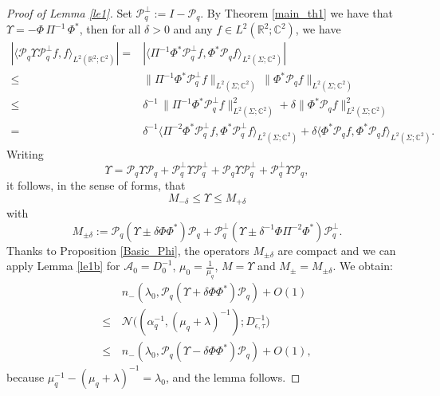 \documentclass[11pt,a4paper,reqno,oneside]{amsproc}
\def \cc {{\mathbb C}}
\numberwithin{equation}{section}
\def \cc {{\mathbb{C}}}
\begin{document}
\begin{proof}[Proof of Lemma \ref{le1}]  Set $\mathcal P_q^{\perp}:= I -\mathcal P_q$.  By Theorem \ref{main_th1} we have that  $\Upsilon= -\Phi\,\Pi^{-1}\,\Phi^{*}$, 
then for all $\delta > 0$ and any $f\in L^2(\mathbb R^2;\cc^2)$, we have 
\begin{align*}
|\langle \mathcal P_q \Upsilon  \mathcal P_q^{\perp} f, f \rangle_{L^2(\mathbb R^2;\cc^2)}|
= &|\langle \Pi^{-1}\Phi^* \mathcal P_q^{\perp} f, \Phi^*\mathcal P_q f \rangle_{L^2(\Sigma;\cc^2)}|\\
\leq & \|\Pi^{-1} \Phi^* \mathcal P_q^{\perp} f\|_{L^2(\Sigma;\cc^2)} \, \|\Phi^* \mathcal P_qf \|_{L^2(\Sigma;\cc^2)} \\
\leq & \delta^{-1} \, \|\Pi^{-1} \Phi^* \mathcal P_q^{\perp} f\|_{L^2(\Sigma;\cc^2)}^2 + \delta \|\Phi^* \mathcal P_qf \|_{L^2(\Sigma;\cc^2)}^2\\
=&\delta^{-1} \langle \Pi^{-2}\Phi^* \mathcal P_q^{\perp} f, \Phi^*\mathcal P_q^{\perp} f \rangle_{L^2(\Sigma;\cc^2)}
+ \delta\langle \Phi^* \mathcal P_q f, \Phi^*\mathcal P_q f \rangle_{L^2(\Sigma;\cc^2)}.
\end{align*}
Writing
\[
\Upsilon = \mathcal P_q \Upsilon \mathcal P_q + \mathcal P_q^{\perp} \Upsilon \mathcal P_q^{\perp} + \mathcal P_q \Upsilon \mathcal P_q^{\perp} + \mathcal P_q^{\perp} \Upsilon \mathcal P_q,
\]
it follows, in the sense of forms, that  
\[
M_{-\delta} \leq \Upsilon \leq M_{+\delta} 
\]
with
\[M_{\pm \delta}:= \mathcal P_q( \Upsilon \pm \delta \Phi \Phi^{*})\mathcal P_q 
+ \mathcal P_q^{\perp}( \Upsilon \pm \delta^{-1} \Phi \Pi^{-2}\Phi^*)\mathcal P_q^{\perp} .
\]
Thanks to Proposition \ref{Basic_Phi}, the operators $M_{\pm \delta}$ are compact and we can apply Lemma \ref{le1b} for $\mathcal A_0= D_0^{-1} $, $\mu_0=\frac1{\mu_q}$, $M= \Upsilon$ and $M_\pm=M_{\pm \delta}$. We obtain:
\begin{align*}
	&n_-(\lambda_0,\mathcal P_q(\Upsilon + \delta \Phi \Phi^{*})\mathcal P_q)+O(1)\\
	\leq\, & \mathcal N \Big((\alpha_q^{-1},(\mu_q+\lambda)^{-1});{D_{\epsilon,\tau}^{-1}}\Big)\\ \leq & n_-(\lambda_0,\mathcal P_q(\Upsilon - \delta \Phi \Phi^{*})\mathcal P_q)+O(1),
\end{align*}
because $\mu_q^{-1} - (\mu_q+\lambda)^{-1} = \lambda_0 $, and the lemma follows.
\end{proof}
\end{document}
